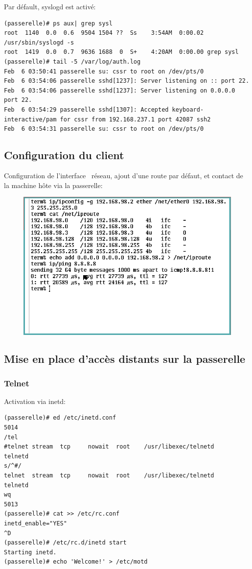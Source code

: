 \documentclass[a4paper]{article}
\begin{document}
Par défault, syslogd est activé:
\begin{verbatim}
(passerelle)# ps aux| grep sysl
root  1140  0.0  0.6  9504 1504 ??  Ss    3:54AM  0:00.02 /usr/sbin/syslogd -s
root  1419  0.0  0.7  9636 1688  0  S+    4:20AM  0:00.00 grep sysl
(passerelle)# tail -5 /var/log/auth.log
Feb  6 03:50:41 passerelle su: cssr to root on /dev/pts/0
Feb  6 03:54:06 passerelle sshd[1237]: Server listening on :: port 22.
Feb  6 03:54:06 passerelle sshd[1237]: Server listening on 0.0.0.0 port 22.
Feb  6 03:54:29 passerelle sshd[1307]: Accepted keyboard-interactive/pam for cssr from 192.168.237.1 port 42087 ssh2
Feb  6 03:54:31 passerelle su: cssr to root on /dev/pts/0
\end{verbatim}

\subsection{Configuration du client}
Configuration de l'\og interface \fg\ réseau, ajout d'une route par
défaut, et contact de la machine hôte via la passerelle:
\begin{figure}[!ht]
	\centering
	\includegraphics[scale=.5]{ipconfig.png}
\end{figure}

\subsection{Mise en place d'accès distants sur la passerelle}
\subsubsection{Telnet}
Activation via inetd:
\begin{verbatim}
(passerelle)# ed /etc/inetd.conf 
5014
/tel
#telnet stream  tcp     nowait  root    /usr/libexec/telnetd    telnetd
s/^#/
telnet  stream  tcp     nowait  root    /usr/libexec/telnetd    telnetd
wq
5013
(passerelle)# cat >> /etc/rc.conf 
inetd_enable="YES"
^D
(passerelle)# /etc/rc.d/inetd start
Starting inetd.
(passerelle)# echo 'Welcome!' > /etc/motd
\end{verbatim}
\end{document}
